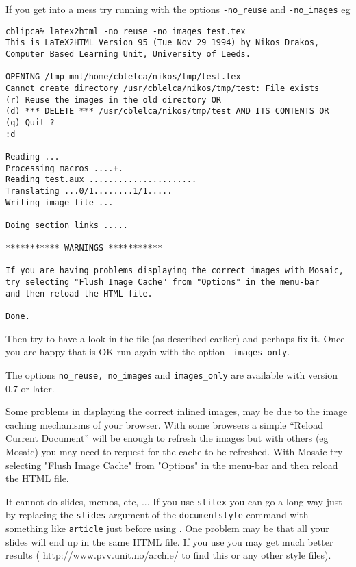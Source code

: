 \begin{htmllist}
If you get into a mess try running \latextohtml{} with the options
\texttt{-no\_reuse} and \texttt{-no\_images} eg
\begin{verbatim}
cblipca% latex2html -no_reuse -no_images test.tex
This is LaTeX2HTML Version 95 (Tue Nov 29 1994) by Nikos Drakos, 
Computer Based Learning Unit, University of Leeds.

OPENING /tmp_mnt/home/cblelca/nikos/tmp/test.tex 
Cannot create directory /usr/cblelca/nikos/tmp/test: File exists
(r) Reuse the images in the old directory OR
(d) *** DELETE *** /usr/cblelca/nikos/tmp/test AND ITS CONTENTS OR
(q) Quit ?
:d

Reading ...
Processing macros ....+.
Reading test.aux ......................
Translating ...0/1........1/1.....
Writing image file ...

Doing section links .....

*********** WARNINGS ***********

If you are having problems displaying the correct images with Mosaic,
try selecting "Flush Image Cache" from "Options" in the menu-bar 
and then reload the HTML file.

Done.
\end{verbatim}

Then try to have a look 
in the file   (as described earlier) and perhaps fix it.
Once you are happy that  is OK run \latextohtml{}
again with the option \texttt{-images\_only}.

The options \texttt{no\_reuse, no\_images} and \texttt{images\_only}
are available with \latextohtml{} version 0.7 or later.

Some problems in displaying the correct inlined images,
may be due to the image caching mechanisms of your browser.
With some browsers a simple ``Reload Current Document'' will be enough
to refresh the images but with others (eg Mosaic) you may need
to request for the cache to be refreshed. With Mosaic try 
selecting "Flush Image Cache" from "Options" in the menu-bar 
and then reload the HTML file.


\item [It cannot do slides, memos, etc, ...] 
If you use \texttt{slitex} you can go a long way just by replacing 
the \texttt{slides} argument of the \texttt{documentstyle} command with 
something like \texttt{article} just before using \latextohtml.
One problem may be that all your slides will end up in the  same HTML 
file.
If you use  you may get much better results 
(
{http://www.pvv.unit.no/archie/} to find this or any other
style files).
\end{htmllist}

